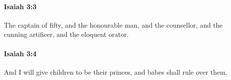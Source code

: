 		\paragraph{Isaiah 3:3} %
			\label{ISAIAH-3-3}

			The captain of fifty, and the honourable man, and the counsellor, and the cunning artificer, and the eloquent orator.


		\paragraph{Isaiah 3:4} %
			\label{ISAIAH-3-4}

			And I will give children to be their princes, and babes shall rule over them.


